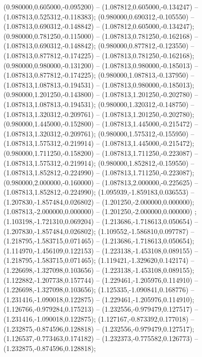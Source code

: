  (0.980000,0.605000,-0.095200) -- (1.087812,0.605000,-0.134247) -- (1.087813,0.525312,-0.118383);
 (0.980000,0.690312,-0.105550) -- (1.087813,0.690312,-0.148842) -- (1.087812,0.605000,-0.134247);
 (0.980000,0.781250,-0.115000) -- (1.087813,0.781250,-0.162168) -- (1.087813,0.690312,-0.148842);
 (0.980000,0.877812,-0.123550) -- (1.087813,0.877812,-0.174225) -- (1.087813,0.781250,-0.162168);
 (0.980000,0.980000,-0.131200) -- (1.087813,0.980000,-0.185013) -- (1.087813,0.877812,-0.174225);
 (0.980000,1.087813,-0.137950) -- (1.087813,1.087813,-0.194531) -- (1.087813,0.980000,-0.185013);
 (0.980000,1.201250,-0.143800) -- (1.087813,1.201250,-0.202780) -- (1.087813,1.087813,-0.194531);
 (0.980000,1.320312,-0.148750) -- (1.087813,1.320312,-0.209761) -- (1.087813,1.201250,-0.202780);
 (0.980000,1.445000,-0.152800) -- (1.087813,1.445000,-0.215472) -- (1.087813,1.320312,-0.209761);
 (0.980000,1.575312,-0.155950) -- (1.087813,1.575312,-0.219914) -- (1.087813,1.445000,-0.215472);
 (0.980000,1.711250,-0.158200) -- (1.087813,1.711250,-0.223087) -- (1.087813,1.575312,-0.219914);
 (0.980000,1.852812,-0.159550) -- (1.087813,1.852812,-0.224990) -- (1.087813,1.711250,-0.223087);
 (0.980000,2.000000,-0.160000) -- (1.087813,2.000000,-0.225625) -- (1.087813,1.852812,-0.224990);
 (1.095939,-1.859183,0.036553) -- (1.207830,-1.857484,0.026802) -- (1.201250,-2.000000,0.000000);
 (1.087813,-2.000000,0.000000) -- (1.201250,-2.000000,0.000000) ;
 (1.103198,-1.721310,0.069204) -- (1.213686,-1.718613,0.050654) -- (1.207830,-1.857484,0.026802);
 (1.109552,-1.586810,0.097787) -- (1.218795,-1.583715,0.071465) -- (1.213686,-1.718613,0.050654);
 (1.114970,-1.456109,0.122153) -- (1.223138,-1.453108,0.089155) -- (1.218795,-1.583715,0.071465);
 (1.119421,-1.329620,0.142174) -- (1.226698,-1.327098,0.103656) -- (1.223138,-1.453108,0.089155);
 (1.122882,-1.207738,0.157744) -- (1.229461,-1.205976,0.114910) -- (1.226698,-1.327098,0.103656);
 (1.125335,-1.090841,0.168776) -- (1.231416,-1.090018,0.122875) -- (1.229461,-1.205976,0.114910);
 (1.126766,-0.979284,0.175213) -- (1.232556,-0.979479,0.127517) -- (1.231416,-1.090018,0.122875);
 (1.127167,-0.873392,0.177018) -- (1.232875,-0.874596,0.128818) -- (1.232556,-0.979479,0.127517);
 (1.126537,-0.773463,0.174182) -- (1.232373,-0.775582,0.126773) -- (1.232875,-0.874596,0.128818);
